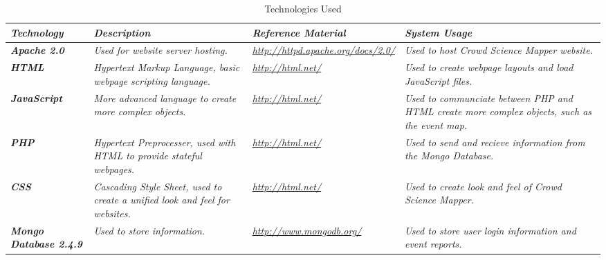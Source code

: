 \begin{table}[tbhp!]
\caption{Technologies Used \label{technologies}}
\begin{center}
\begin{tabular}{|>{\raggedright}p{2cm}|>{\raggedright}p{4cm}|>{\raggedright}p{4cm}|>{\raggedright}p{4cm}|}

  \hline
\textit{\textbf{Technology}} &  \textit{\textbf{Description}} & \textit{\textbf{Reference Material}} & \textit{\textbf{System Usage}}\tabularnewline
\hline
 \textit{\textbf{Apache 2.0}} & \textit{Used for website server hosting.} & \textit{\url{http://httpd.apache.org/docs/2.0/}} & \textit{Used to host Crowd Science Mapper website.}\tabularnewline
\hline
 \textit{\textbf{HTML}} & \textit{Hypertext Markup Language, basic webpage scripting language.} & \textit{\url{http://html.net/}} & \textit{Used to create webpage layouts and load JavaScript files.}\tabularnewline
 \hline
  \textit{\textbf{JavaScript}} & \textit{More advanced language to create more complex objects.} & \textit{\url{http://html.net/}} & \textit{Used to communciate between PHP and HTML create more complex objects, such as the event map.}\tabularnewline
 \hline
  \textit{\textbf{PHP}} & \textit{Hypertext Preprocesser, used with HTML to provide stateful webpages.} & \textit{\url{http://html.net/}} & \textit{Used to send and recieve information from the Mongo Database.}\tabularnewline
 \hline
  \textit{\textbf{CSS}} & \textit{Cascading Style Sheet, used to create a unified look and feel for websites.} & \textit{\url{http://html.net/}} & \textit{Used to create look and feel of Crowd Science Mapper.}\tabularnewline
 \hline
  \textit{\textbf{Mongo Database 2.4.9}} & \textit{Used to store information.} & \textit{\url{http://www.mongodb.org/}} & \textit{Used to store user login information and event reports.}\tabularnewline
\hline
\end{tabular}
\end{center}
\end{table}

